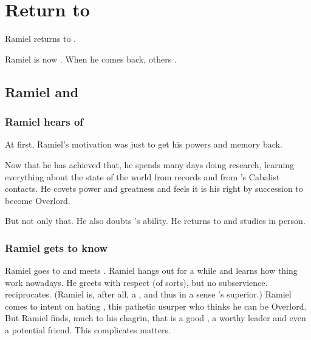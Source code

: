 \section[Return to Mystraacht]{Return to \Mystraacht}
Ramiel returns to \Mystraacht. 


Ramiel is now .
When he comes back, others . 





\subsection{Ramiel and \Dasteron}





\subsubsection{Ramiel hears of \Dasteron}
At first, Ramiel's motivation was just to get his powers and memory back. 

Now that he has achieved that, he spends many days doing research, learning everything about the state of the world from records and from \Cishiel's Cabalist contacts.
He covets power and greatness and feels it is his right by succession to become Overlord.

But not only that.
He also doubts \Dasteron's ability.
He returns to \Mystraacht and studies \Dasteron in person.





\subsubsection{Ramiel gets to know \Dasteron}
Ramiel goes to \Mystraacht and meets \Dasteron.
Ramiel hangs out for a while and learns how thing work nowadays.
He greets \Dasteron with respect (of sorts), but no subservience.
\Dasteron reciprocates. (Ramiel is, after all, a \sathariah, and thus in a sense \Dasteron's superior.)
Ramiel comes to \Mystraacht intent on hating \Dasteron, this pathetic usurper who thinks he can be Overlord.
But Ramiel finds, much to his chagrin, that \Dasteron is a good \resphan, a worthy leader and even a potential friend.
This complicates matters.





